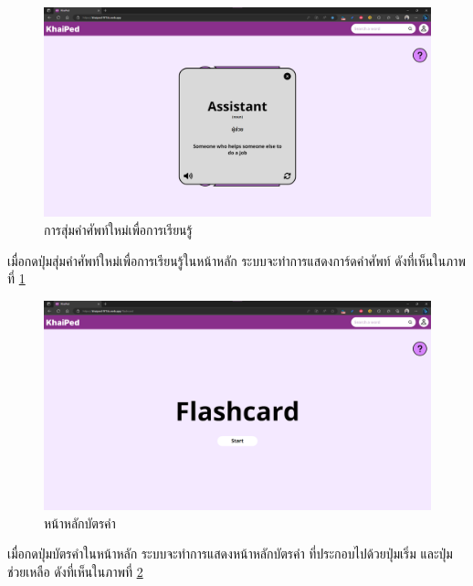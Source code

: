 \documentclass[12pt,oneside,openright,a4paper]{cpe-thai-project}
\begin{document}
\pagebreak
\begin{figure}[!h]\centering
	\includegraphics[width=\textwidth, keepaspectratio=true]{image/chap4/UI/random.png}
	\caption{{การสุ่มคำศัพท์ใหม่เพื่อการเรียนรู้}}\label{fig:chap4UIRandom}
\end{figure}
\hspace{1cm}
เมื่อกดปุ่มสุ่มคำศัพท์ใหม่เพื่อการเรียนรู้ในหน้าหลัก ระบบจะทำการแสดงการ์ดคำศัพท์ ดังที่เห็นในภาพที่ \ref{fig:chap4UIRandom}

\begin{figure}[!h]\centering
	\includegraphics[width=\textwidth, keepaspectratio=true]{image/chap4/UI/flashcard/flashcard.png}
	\caption{{หน้าหลักบัตรคำ}}\label{fig:chap4UIFlash}
\end{figure}
\hspace{1cm}
เมื่อกดปุ่มบัตรคำในหน้าหลัก ระบบจะทำการแสดงหน้าหลักบัตรคำ ที่ประกอบไปด้วยปุ่มเริ่ม และปุ่มช่วยเหลือ
ดังที่เห็นในภาพที่ \ref{fig:chap4UIFlash}
\end{document}
